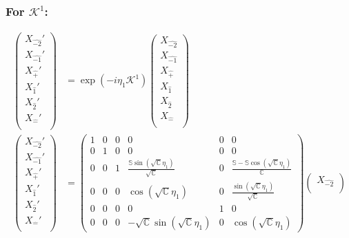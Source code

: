 \documentclass[]{article}
\numberwithin{equation}{section}
\begin{document}
{{\subsubsection{For $\mathcal{K}^{1}$:}
\begin{align}
\begin{pmatrix}
    {X}_{\hat{-2}}'\\
    {X}_{\hat{-1}}'\\
    {X}_{\hat{+}}'\\
    {X}_{\hat{1}}'\\
    {X}_{\hat{2}}'\\
    {X}_{\hat{-}}'\\
    \end{pmatrix}&= \exp{(-i\eta_{1} \mathcal{K}^{1})}\begin{pmatrix}
    {X}_{\hat{-2}}\\
    {X}_{\hat{-1}}\\
    {X}_{\hat{+}}\\
    {X}_{\hat{1}}\\
    {X}_{\hat{2}}\\
    {X}_{\hat{-}}\\
    \end{pmatrix}\\
    \begin{pmatrix}
    {X}_{\hat{-2}}'\\
    {X}_{\hat{-1}}'\\
    {X}_{\hat{+}}'\\
    {X}_{\hat{1}}'\\
    {X}_{\hat{2}}'\\
    {X}_{\hat{-}}'\\
    \end{pmatrix}&= \begin{pmatrix}
        1&0&0&0&0&0\\
        0&1&0&0&0&0\\
        0&0&1&\frac{\mathbb{S}\sin{(\sqrt{\mathbb{C}}\eta_{1})}}{\sqrt{\mathbb{C}}}&0&\frac{\mathbb{S}-\mathbb{S}\cos{(\sqrt{\mathbb{C}}\eta_{1})}}{\mathbb{C}}\\
        0&0&0&\cos{(\sqrt{\mathbb{C}}\eta_{1})}&0&\frac{\sin{(\sqrt{\mathbb{C}}\eta_{1})}}{\sqrt{\mathbb{C}}}\\
        0&0&0&0&1&0\\
        0&0&0&-\sqrt{\mathbb{C}}\sin{(\sqrt{\mathbb{C}}\eta_{1})}&0&\cos{(\sqrt{\mathbb{C}}\eta_{1})}
    \end{pmatrix}\begin{pmatrix}
    {X}_{\hat{-2}}\\

\end{pmatrix}
\end{align}}}
\end{document}
